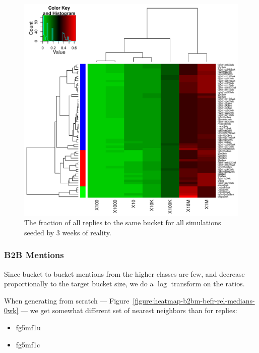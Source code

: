 \documentclass[10pt,oneside]{memoir}
\begin{document}
\begin{Spacing}{2}
\begin{figure}
\begin{center}
    \includegraphics{figures/crop/heatmap-b2br-self-rel-medians-3wk}
    \caption{The fraction of all replies to the same bucket for all simulations seeded by 3 weeks of reality.}
    \label{figure:heatmap-b2br-self-rel-medians-3wk}
\end{center}
\end{figure}
\pagebreak \subsubsection{B2B Mentions}
\label{b2bmentions}

Since bucket to bucket mentions from the higher classes are few, and decrease proportionally to the target bucket size, we do a $\log$ transform on the ratios.


When generating from scratch --- Figure~\ref{figure:heatmap-b2bm-befr-rel-medians-0wk} --- we get somewhat different set of nearest neighbors than for replies:


\begin{itemize}


\item fg5mf1u

\item fg5mf1c


\end{itemize}
\end{Spacing}
\end{document}
